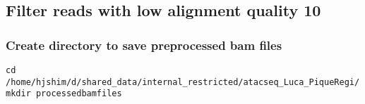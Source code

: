\documentclass[11pt]{article}
\begin{document}
\subsection{Filter reads with low alignment quality 10}
\label{sec-2-3}
\subsubsection{Create directory to save preprocessed bam files}
\label{sec-2-3-1}
\begin{lstlisting}
cd /home/hjshim/d/shared_data/internal_restricted/atacseq_Luca_PiqueRegi/
mkdir processedbamfiles
\end{lstlisting}
\end{document}
